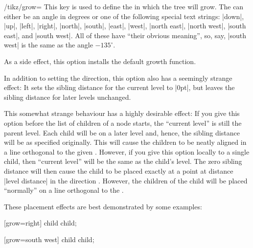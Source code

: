 \begin{key}{/tikz/grow=}
    This key is used to define the  in which the tree will
    grow. The  can either be an angle in degrees or one of the
    following special text strings: |down|, |up|, |left|, |right|, |north|,
    |south|, |east|, |west|, |north east|, |north west|, |south east|, and
    |south west|. All of these have ``their obvious meaning'', so, say,
    |south west| is the same as the angle $-135^\circ$.

    As a side effect, this option installs the default growth function.

    In addition to setting the direction, this option also has a seemingly
    strange effect: It sets the sibling distance for the current level to
    |0pt|, but leaves the sibling distance for later levels unchanged.

    This somewhat strange behaviour has a highly desirable effect: If you give
    this option before the list of children of a node starts, the ``current
    level'' is still the parent level. Each child will be on a later level and,
    hence, the sibling distance will be as specified originally. This will
    cause the children to be neatly aligned in a line orthogonal to the given
    . However, if you give this option locally to a single
    child, then ``current level'' will be the same as the child's level. The
    zero sibling distance will then cause the child to be placed exactly at a
    point at distance |level distance| in the direction .
    However, the children of the child will be placed ``normally'' on a line
    orthogonal to the .

    These placement effects are best demonstrated by some examples:
\begin{codeexample}[]
\tikz {} [grow=right] child child;
\end{codeexample}

\begin{codeexample}[]
\tikz {} [grow=south west] child child;
\end{codeexample}

\begin{codeexample}[]
\end{codeexample}


\end{key}
